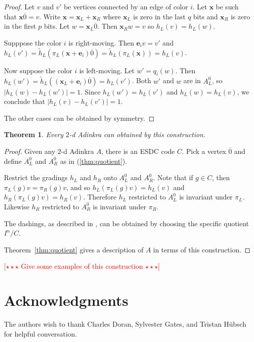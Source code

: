 \documentclass[12pt,twoside,singlespace]{article}
\numberwithin{equation}{section}
\newtheorem{thm}[equation]{Theorem}
\theoremstyle{definition}
\newcommand{\com}[1]{\textcolor{red}{$[\star \star \star$ #1 $\star \star \star]$}}
\renewcommand{\vec}[1]{\mathbf{#1}}
\begin{document}
\begin{proof}
Let $v$ and $v'$ be vertices connected by an edge of color $i$.  Let $\vec{x}$ be such that $\vec{x}\overline{0}=v$.  Write $\vec{x}=\vec{x}_L+\vec{x}_R$ where $\vec{x}_L$ is zero in the last $q$ bits and $\vec{x}_R$ is zero in the first $p$ bits.  Let $w=\vec{x}_L\overline{0}$.  Then $\vec{x}_R w = v$ so $h_L(v)=h_L(w)$.

Supppose the color $i$ is right-moving.  Then $\vec{e}_i v = v'$ and $h_L(v')=\tilde{h}_L(\pi_L(\vec{x}+\vec{e}_i)\overline{0})=\tilde{h}_L(\pi_L(\vec{x}))=h_L(v)$.


Now suppose the color $i$ is left-moving.  Let $w'=q_i(w)$.  Then 
$h_L(w')=\tilde{h}_L((\vec{x}_L+\vec{e}_i)\overline{0})=h_L(v')$.  Both $w'$ and $w$ are in $A_L^0$, so $|h_L(w)-h_L(w')|=1$.  Since $h_L(w')=h_L(v')$ and $h_L(w)=h_L(v)$, we conclude that $|h_L(v)-h_L(v')|=1$.

The other cases can be obtained by symmetry.
\end{proof}


\begin{thm}
Every $2$-d Adinkra can obtained by this construction.
\end{thm}

\begin{proof}
Given any $2$-d Adinkra $A$, there is an ESDC code $C$.  Pick a vertex $\overline{0}$ and define $A_L^0$ and $A_R^0$ as in (\ref{thm:quotient}).

Restrict the gradings $h_L$ and $h_R$ onto $A_L^0$ and $A_R^0$.  Note that if $g\in C$, then $\pi_L(g)v=\pi_R(g)v$, and so $h_L(\pi_L(g)v)=h_L(v)$ and $h_R(\pi_L(g)v)=h_R(v)$.  Therefore $h_L$ restricted to $A_L^0$ is invariant under $\pi_L$.  Likewise $h_R$ restricted to $A_R^0$ is invariant under $\pi_R$.

The dashings, as described in \cite{d2l:topology}, can be obtained by choosing the specific quotient $I^n/C$.

Theorem~\ref{thm:quotient} gives a description of $A$ in terms of this construction.

\end{proof}

\com{Give some examples of this construction}

\section*{Acknowledgments}

The authors wish to thank Charles Doran, Sylvester Gates, and Tristan H\"ubsch for helpful conversation.
\end{document}
